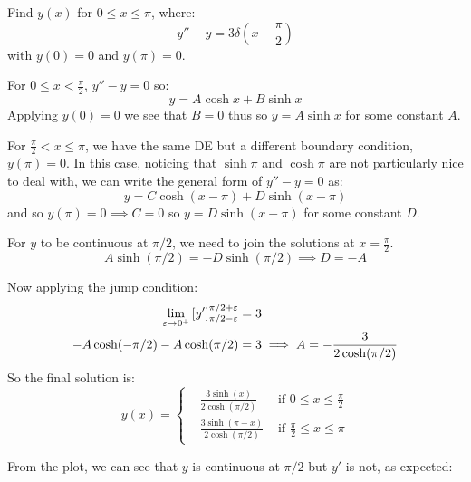 \documentclass[../main.tex]{subfiles}
\begin{document}
\begin{example}
  Find $y(x)$ for $0 \leq x \leq \pi$, where:
  \[
    y'' - y = 3\delta\left(x - \frac{\pi}{2}\right)
  \]
  with $y(0) = 0$ and $y(\pi) = 0$.

  For $0 \leq x < \frac{\pi}{2}$, $y'' - y= 0$ so:
  \[
    y = A \cosh x + B \sinh x
  \]
  Applying $y(0) = 0$ we see that $B = 0$ thus so $y = A \sinh x$ for some constant $A$.

  For $\frac{\pi}{2} < x \leq \pi$, we have the same DE but a different boundary condition, $y(\pi) = 0$.
  In this case, noticing that $\sinh \pi$ and $\cosh \pi$ are not particularly nice to deal with, we can write the general form of $y'' - y = 0$ as:
  \[
    y = C \cosh(x - \pi) + D \sinh(x - \pi)
  \]
  and so $y(\pi) = 0 \implies C = 0$ so $y = D\sinh(x - \pi)$ for some constant $D$.

  For $y$ to be continuous at $\pi / 2$, we need to join the solutions at $x = \frac{\pi}{2}$.
  \[
    A\sinh(\pi/2) = -D\sinh(\pi/2) \implies D = -A
  \]

  Now applying the jump condition:
  \begin{align*}
    \lim_{\varepsilon \to 0^{+}} \left[y'\right]_{\pi/2 - \varepsilon}^{\pi/2 + \varepsilon} &= 3 \\
    -A\cosh(-\pi/2) - A\cosh(\pi/2) &= 3 \implies A = -\frac{3}{2\cosh(\pi/2)}
  \end{align*}
  So the final solution is:
  \[
    y(x) = \begin{cases}
    -\frac{3\sinh(x)}{2\cosh(\pi/2)} & \text{ if } 0 \leq x \leq \frac{\pi}{2} \\
    -\frac{3\sinh(\pi - x)}{2\cosh(\pi/2)} & \text{ if } \frac{\pi}{2} \leq x \leq \pi
    \end{cases}
  \]

  From the plot, we can see that $y$ is continuous at $\pi/2$ but $y'$ is not, as expected:
  \begin{center}
  \end{center}
\end{example}
\end{document}
